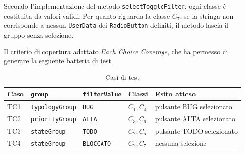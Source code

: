 \noindent Secondo l'implementazione del metodo \texttt{selectToggleFilter}, ogni classe è costituita da valori validi.
Per quanto riguarda la classe $C_7$, se la stringa non corrisponde a nessun \texttt{UserData} dei 
\texttt{RadioButton} definiti, il metodo lascia il gruppo senza selezione.

\noindent Il criterio di copertura adottato \textit{Each Choice Coverage}, che ha permesso
di generare la seguente batteria di test

\begin{table}[ht]
  \centering
  \small
  \caption{Casi di test}
  \label{tab:test-selecttogglefilter}
  \begin{tabular}{@{}llllp{4cm}@{}}
    \toprule
    Caso & \texttt{group} & \texttt{filterValue} & Classi & Esito atteso \\
    \midrule
    TC1 & \texttt{typologyGroup} & \texttt{BUG}  & $C_1, C_4$ & pulsante BUG selezionato  \\
    TC2 & \texttt{priorityGroup} & \texttt{ALTA} & $C_3, C_6$ & pulsante ALTA selezionato \\
    TC3 & \texttt{stateGroup}    & \texttt{TODO} & $C_2, C_5$ & pulsante TODO selezionato \\
    TC4 & \texttt{stateGroup} & \texttt{BLOCCATO}  & $C_2, C_7$ & nessuna selezione         \\
    \bottomrule
  \end{tabular}
\end{table}

\clearpage


